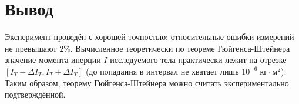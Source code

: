 \section{Вывод}

Эксперимент проведён с хорошей точностью: относительные ошибки измерений не превышают $2\%$. Вычисленное теоретически по теореме Гюйгенса-Штейнера значение момента инерции $I$ исследуемого тела практически лежит на отрезке $[I_T-\Delta I_T,I_T+\Delta I_T]$ (до попадания в интервал не хватает лишь $10^{-6}\;\text{кг}\cdot\text{м}^2$). Таким образом, теорему Гюйгенса-Штейнера можно считать экспериментально подтверждённой.